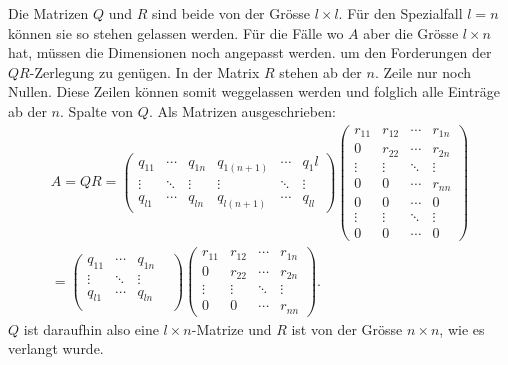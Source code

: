 Die Matrizen $Q$ und $R$ sind beide von der Grösse $l\times l$.
Für den Spezialfall $l=n$ können sie so stehen gelassen werden.
Für die Fälle wo $A$ aber die Grösse $l\times n$ hat, müssen die Dimensionen noch angepasst werden. um den Forderungen der $QR$-Zerlegung zu genügen.
In der Matrix $R$ stehen ab der $n.$ Zeile nur noch Nullen.
Diese Zeilen können somit weggelassen werden und folglich alle Einträge ab der $n.$ Spalte von $Q$.
Als Matrizen ausgeschrieben:
\begin{multline*}
A=QR=
\begin{pmatrix}
q_{11}&\cdots&q_{1n}&q_{1(n+1)}&\cdots&q_1l\\
\vdots&\ddots&\vdots&\vdots    &\ddots&\vdots\\
q_{l1}&\cdots&q_{ln}&q_{l(n+1)}&\cdots&q_{ll}
\end{pmatrix}
\begin{pmatrix}
r_{11}&r_{12}&\cdots&r_{1n}\\
0     &r_{22}&\cdots&r_{2n}\\
\vdots&\vdots&\ddots&\vdots\\
0     &0     &\cdots&r_{nn}\\
0     &0     &\cdots&0\\
\vdots&\vdots&\ddots&\vdots\\
0     &0     &\cdots&0
\end{pmatrix}\\=
\begin{pmatrix}
q_{11}&\cdots&q_{1n}&\\
\vdots&\ddots&\vdots&\\
q_{l1}&\cdots&q_{ln}\\
\end{pmatrix}
\begin{pmatrix}
r_{11}&r_{12}&\cdots&r_{1n}\\
0     &r_{22}&\cdots&r_{2n}\\
\vdots&\vdots&\ddots&\vdots\\
0     &0     &\cdots&r_{nn}
\end{pmatrix}.
\end{multline*}
$Q$ ist daraufhin also eine $l\times n$-Matrize und $R$ ist von der Grösse $n\times n$, wie es verlangt wurde.

